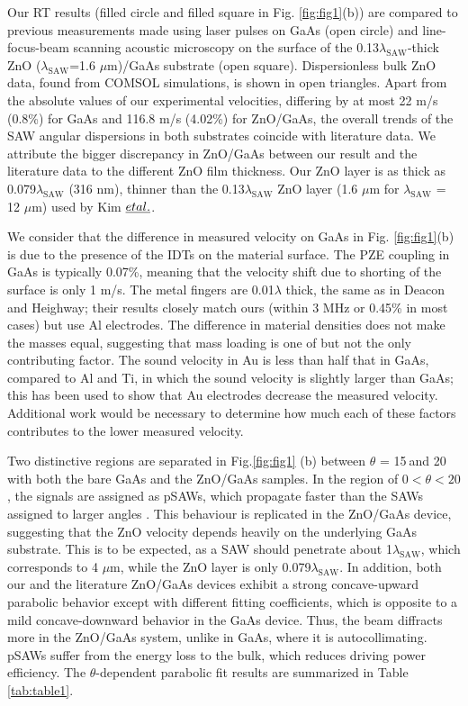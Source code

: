 \documentclass[aps,prb,amsmath,amssymb,footinbib,showpacs,superscriptaddress]{revtex4-1}%
\begin{document}
Our RT results (filled circle and filled square in Fig. \ref{fig:fig1}(b)) are compared to previous measurements made using laser pulses on GaAs\cite{Flannery1999} (open circle) and line-focus-beam scanning acoustic microscopy on the surface of the 0.13$\lambda_\text{SAW}$-thick ZnO ($\lambda_\text{SAW}$=1.6 $\mu$m)/GaAs substrate \cite{Kim1994}(open square). Dispersionless bulk ZnO data, found from COMSOL simulations, is shown in open triangles. Apart from the absolute values of our experimental velocities, differing by at most 22 m/s (0.8\%) for GaAs and 116.8 m/s (4.02\%) for ZnO/GaAs, the overall trends of the SAW angular dispersions in both substrates coincide with literature data. We attribute the bigger discrepancy in ZnO/GaAs between our result and the literature data to the different ZnO film thickness. Our ZnO layer is as thick as 0.079$\lambda_\text{SAW}$ (316 nm), thinner than the 0.13$\lambda_\text{SAW}$ ZnO layer (1.6 $\mu$m for $\lambda_\text{SAW}$ = 12 $\mu$m) used by Kim $\emph{et al.}$\cite{Kim1994}. 

We consider that the difference in measured velocity on GaAs in Fig. \ref{fig:fig1}(b) is due to the presence of the IDTs on the material surface. The PZE coupling in GaAs is typically 0.07\%\cite{Kim19942}, meaning that the velocity shift due to shorting of the surface is only 1 m/s. The metal fingers are 0.01$\lambda$ thick, the same as in Deacon and Heighway\cite{Deacon1972}; their results closely match ours (within 3 MHz or 0.45\% in most cases) but use Al electrodes. The difference in material densities does not make the masses equal, suggesting that mass loading is one of but not the only contributing factor. The sound velocity in Au is less than half that in GaAs, compared to Al and Ti, in which the sound velocity is slightly larger than GaAs; this has been used to show that Au electrodes decrease the measured velocity\cite{Takagaki2002}. Additional work would be necessary to determine how much each of these factors contributes to the lower measured velocity.

Two distinctive regions are separated in Fig.\ref{fig:fig1} (b) between $\theta$ = 15\textdegree$\>$and 20\textdegree$\>$ with both the bare GaAs and the ZnO/GaAs samples. In the region of $ 0 < \theta < 20$\textdegree,  the signals are assigned as pSAWs, which propagate faster than the SAWs assigned to  larger angles \cite{Hunt1986, Flannery1999, Deacon1972}. This behaviour is replicated in the ZnO/GaAs device, suggesting that the ZnO velocity depends heavily on the underlying GaAs substrate. This is to be expected, as a SAW should penetrate about 1$\lambda_\text{SAW}$, which corresponds to 4 $\mu$m, while the ZnO layer is only 0.079$\lambda_\text{SAW}$. In addition, both our and the literature ZnO/GaAs devices exhibit a strong concave-upward parabolic behavior except with different fitting coefficients, which is opposite to a mild concave-downward behavior in the GaAs device. Thus, the beam diffracts more in the ZnO/GaAs system, unlike in GaAs, where it is autocollimating\cite{Kim1994}. pSAWs suffer from the energy loss to the bulk, which reduces driving power efficiency. The $\theta$-dependent parabolic fit results are summarized in Table \ref{tab:table1}.
\end{document}
